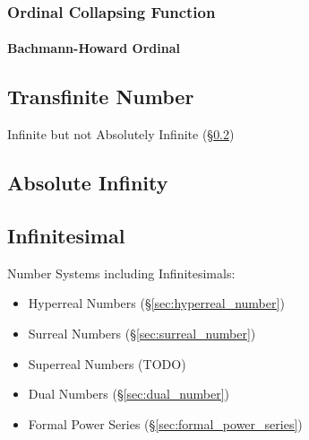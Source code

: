 \subsubsection{Ordinal Collapsing Function}
\label{sec:ordinal_collapsing}

\paragraph{Bachmann-Howard Ordinal}\label{sec:bachmann_howard}



\subsection{Transfinite Number}\label{sec:transfinite_number}

Infinite but not Absolutely Infinite (\S\ref{sec:absolute_infinity})



\subsection{Absolute Infinity}\label{sec:absolute_infinity}

\subsection{Infinitesimal}\label{sec:infinitesimal}

Number Systems including Infinitesimals:
\begin{itemize}
  \item Hyperreal Numbers (\S\ref{sec:hyperreal_number})
  \item Surreal Numbers (\S\ref{sec:surreal_number})
  \item Superreal Numbers (TODO)
  \item Dual Numbers (\S\ref{sec:dual_number})
  \item Formal Power Series (\S\ref{sec:formal_power_series})
\end{itemize}

